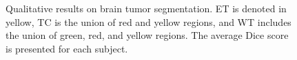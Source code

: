 \documentclass[a4,12pt]{article}
\begin{document}
\begin{figure}[!t]
		
		
		
		
		
		\caption{Qualitative results on brain tumor segmentation. ET is denoted in yellow, TC is the union of red and yellow regions, and WT includes the union of green, red, and yellow regions. The average Dice score is presented for each subject.}
		
		\label{fig: sample results}
	\end{figure}
	
\end{document}
